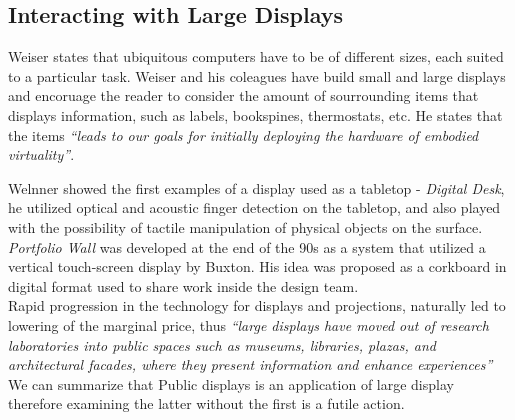 \subsection{Interacting with Large Displays}
Weiser states that ubiquitous computers have to be of different sizes, each suited to a particular task. Weiser and his coleagues have build small and large displays and encoruage the reader to consider the amount of sourrounding items that displays information, such as labels, bookspines, thermostats, etc. He states that the items \emph{``leads to our goals for initially deploying the hardware of embodied virtuality''}.\cite{Weiser:1991} 

Welnner showed the first examples of a display used as a tabletop -  \emph{Digital Desk}\cite{Wellner:1993}, he utilized optical and acoustic finger detection on the tabletop, and also played with the possibility of tactile manipulation of physical objects on the surface. \emph{Portfolio Wall} was developed at the end of the 90s as a system that utilized a vertical touch-screen display by Buxton\cite{Buxton:2000}. His idea was proposed as a corkboard in digital format used to share work inside the design team.\\

Rapid progression in the technology for displays and projections, naturally led to lowering of the marginal price, thus \emph{``large displays have moved out of research laboratories into public spaces such as museums, libraries, plazas, and architectural facades, where they present information and enhance experiences''} \cite{Hinrichs:2013:IPD:2478559.2478965}\\

We can summarize that Public displays is an application of large display therefore examining the latter without the first is a futile action.
